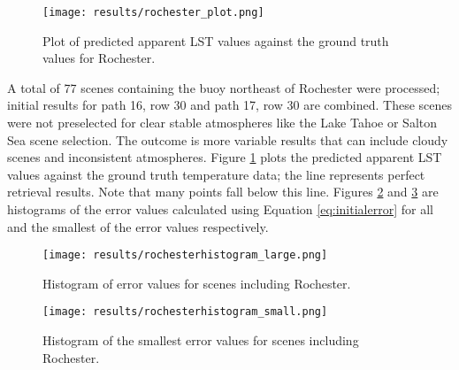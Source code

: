 \documentclass{book}
\begin{document}
\begin{figure}[H]
\centering
\texttt{[image: results/rochester\_plot.png]}
\caption{Plot of predicted apparent LST values against the ground truth values for Rochester.}
\label{fig:rochester_plot}
\end{figure}

A total of 77 scenes containing the buoy northeast of Rochester were processed; initial results for path 16, row 30 and path 17, row 30 are combined.  These scenes were not preselected for clear stable atmospheres like the Lake Tahoe or Salton Sea scene selection.  The outcome is more variable results that can include cloudy scenes and inconsistent atmospheres.  Figure \ref{fig:rochester_plot} plots the predicted apparent LST values against the ground truth temperature data; the line represents perfect retrieval results.  Note that many points fall below this line.  Figures \ref{fig:rochesterhistogram_large} and \ref{fig:rochesterhistogram_small} are histograms of the error values calculated using Equation \ref{eq:initialerror} for all and the smallest of the error values respectively.

\begin{figure}[H]
\centering
\texttt{[image: results/rochesterhistogram\_large.png]}
\caption{Histogram of error values for scenes including Rochester.}
\label{fig:rochesterhistogram_large}
\end{figure}

\begin{figure}[H]
\centering
\texttt{[image: results/rochesterhistogram\_small.png]}
\caption{Histogram of the smallest error values for scenes including Rochester.}
\label{fig:rochesterhistogram_small}
\end{figure}
\end{document}
